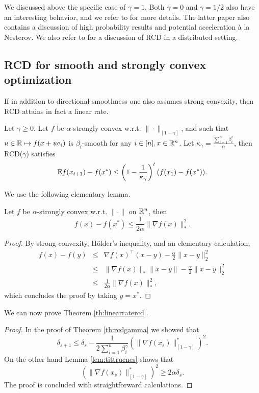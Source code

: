 We discussed above the specific case of $\gamma = 1$. Both $\gamma=0$ and $\gamma=1/2$ also have an interesting behavior, and we refer to \cite{Nes12} for more details. The latter paper also contains a discussion of high probability results and potential acceleration \`a la Nesterov. We also refer to \cite{RT12} for a discussion of RCD in a distributed setting.

\subsection{RCD for smooth and strongly convex optimization}
If in addition to directional smoothness one also assumes strong convexity, then RCD attains in fact a linear rate.
\begin{theorem} \label{th:linearratercd}
Let $\gamma \geq 0$. Let $f$ be $\alpha$-strongly convex w.r.t. $\|\cdot\|_{[1-\gamma]}$, and such that $u \in \mathbb{R} \mapsto f(x + u e_i)$ is $\beta_i$-smooth for any $i \in [n], x \in \mathbb{R}^n$. Let $\kappa_{\gamma} = \frac{\sum_{i=1}^n \beta_i^{\gamma}}{\alpha}$, then RCD($\gamma$) satisfies
$$\mathbb{E} f(x_{t+1}) - f(x^*) \leq \left(1 - \frac1{\kappa_{\gamma}}\right)^t (f(x_1) - f(x^*)) .$$
\end{theorem}
We use the following elementary lemma.
\begin{lemma} \label{lem:tittrucnes}
Let $f$ be $\alpha$-strongly convex w.r.t. $\| \cdot\|$ on $\mathbb{R}^n$, then
$$f(x) - f(x^*) \leq \frac1{2\alpha} \|\nabla f(x)\|_*^2 .$$
\end{lemma}
\begin{proof}
By strong convexity, H{\"o}lder's inequality, and an elementary calculation,
\begin{eqnarray*}
f(x) - f(y) & \leq & \nabla f(x)^{\top} (x-y) - \frac{\alpha}{2} \|x-y\|_2^2 \\
& \leq & \|\nabla f(x)\|_* \|x-y\| - \frac{\alpha}{2} \|x-y\|_2^2 \\
& \leq & \frac1{2\alpha} \|\nabla f(x)\|_*^2 ,
\end{eqnarray*}
which concludes the proof by taking $y = x^*$.
\end{proof}
We can now prove Theorem \ref{th:linearratercd}.
\begin{proof}
In the proof of Theorem \ref{th:rcdgamma} we showed that 
$$\delta_{s+1} \leq \delta_s - \frac{1}{2 \sum_{i=1}^n \beta_i^{\gamma}} \left(\|\nabla f(x_s)\|_{[1-\gamma]}^*\right)^2 .$$
On the other hand Lemma \ref{lem:tittrucnes} shows that 
$$\left(\|\nabla f(x_s)\|_{[1-\gamma]}^*\right)^2 \geq 2 \alpha \delta_s .$$
The proof is concluded with straightforward calculations.
\end{proof}

